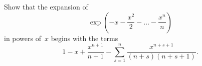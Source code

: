 Show that the expansion of
\[
\exp \left(-x - \frac{x^{2}}{2} - \dots - \frac{x^{n}}{n}\right)
\]
in powers of~$x$ begins with the terms
\[
1 - x + \frac{x^{n+1}}{n + 1}
  - \sum_{s=1}^{n} \frac{x^{n+s+1}}{(n + s)(n + s + 1)}.
\]

